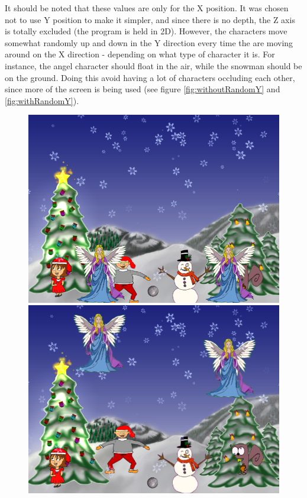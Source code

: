 It should be noted that these values are only for the X position. It was chosen not to use Y position to make it simpler, and since there is no depth, the Z axis is totally excluded (the program is held in 2D). However, the characters move somewhat randomly up and down in the Y direction every time the are moving around on the X direction - depending on what type of character it is. For instance, the angel character should float in the air, while the snowman should be on the ground. Doing this avoid having a lot of characters occluding each other, since more of the screen is being used (see figure \ref{fig:withoutRandomY} and \ref{fig:withRandomY}).

\begin{figure}[htbp] \centering
\begin{minipage}[b]{0.45\textwidth} \centering
\includegraphics[width=1.00\textwidth]{Pictures/Design/without_randomY} %
\end{minipage} \hfill
\begin{minipage}[b]{0.45\textwidth} \centering
\includegraphics[width=1.00\textwidth]{Pictures/Design/with_randomY} %

\end{minipage}
\end{figure}
